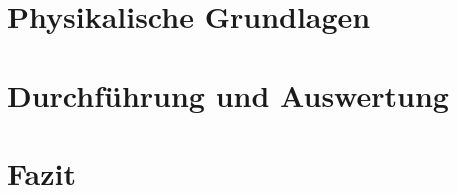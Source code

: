\documentclass[ipkm]{source/fpprotokoll}
\begin{document}
\newpage

\section{Physikalische Grundlagen}


\newpage

\section{Durchführung und Auswertung}


\newpage
\section{Fazit}


\newpage

\printbibliography[heading=lit]
\end{document}
